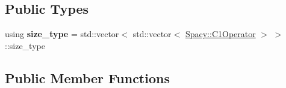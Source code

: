 \subsection*{Public Types}
\begin{DoxyCompactItemize}
\item 
\hypertarget{classSpacy_1_1ProductSpace_1_1C1Operator_af8a66a65fc308eddb19e17acd12cdd30}{using {\bfseries size\-\_\-type} = std\-::vector$<$ std\-::vector$<$ \hyperlink{classSpacy_1_1C1Operator}{Spacy\-::\-C1\-Operator} $>$ $>$\-::size\-\_\-type}\label{classSpacy_1_1ProductSpace_1_1C1Operator_af8a66a65fc308eddb19e17acd12cdd30}

\end{DoxyCompactItemize}
\subsection*{Public Member Functions}
